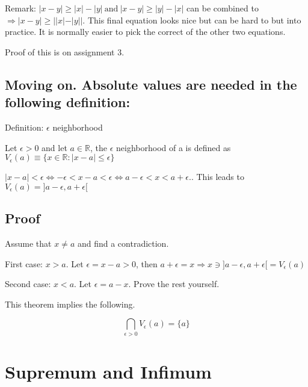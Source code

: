 \documentclass[class=scrartcl, crop=false]{standalone}
\begin{document}
Remark:
$|x - y| \geq |x| - |y| \ \text{and} \ |x - y| \geq |y| - |x|$ can be combined to $\Rightarrow |x - y| \geq ||x| - |y||$. This final equation looks nice but can be hard to but into practice. It is normally easier to pick the correct of the other two equations.

Proof of this is on assignment 3.

\subsection{Moving on. Absolute values are needed in the following definition:}

Definition: $\epsilon$ neighborhood

Let $\epsilon > 0$ and let $a \in \mathbb{R}$, the $\epsilon$ neighborhood of a is defined as $V_\epsilon (a) \equiv \{x \in \mathbb{R}: |x - a| \le \epsilon\}$

$|x - a| < \epsilon \Leftrightarrow -\epsilon < x - a < \epsilon \Leftrightarrow a - \epsilon < x < a + \epsilon.$. This leads to $V_\epsilon (a) = ]a - \epsilon, a + \epsilon[$


\subsection{Proof}

Assume that $x \neq a$ and find a contradiction.

First case: $x > a$. Let $\epsilon = x - a > 0$, then $a + \epsilon = x \Rightarrow x \ni ]a - \epsilon, a + \epsilon[ = V_\epsilon(a)$

Second case:  $x < a$. Let $\epsilon = a - x$. Prove the rest yourself.

This theorem implies the following. 

$$ \bigcap_{\epsilon > 0} V_\epsilon (a) = \{a\} $$

\section{Supremum and Infimum}
\end{document}

